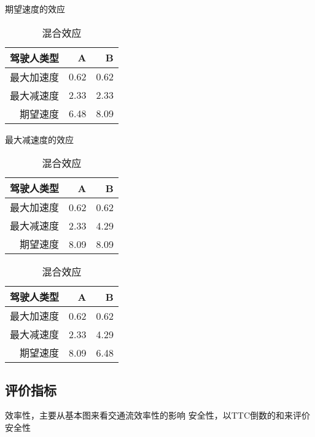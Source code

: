\begin{table}[htb] 
  \begin{minipage}[b]{0.25\linewidth} 
  \centering
  \caption{期望速度的效应}
    \begin{tabular}{rrr}
    \addlinespace
    \toprule
    驾驶人类型    & A     & B \\
    \midrule
    最大加速度 & 0.62  & 0.62 \\
    最大减速度 & 2.33  & 2.33 \\
    期望速度  & 6.48  & 8.09 \\
    \bottomrule
    \end{tabular}%
  \label{speed-factor}%
  \end{minipage}%
\hspace{0.08\linewidth}
  \begin{minipage}[b]{0.25\linewidth} 
  \centering
  \caption{最大减速度的效应}
    \begin{tabular}{rrr}
    \addlinespace
    \toprule
    驾驶人类型    & A     & B \\
    \midrule
    最大加速度 & 0.62  & 0.62 \\
    最大减速度 & 2.33  & 4.29 \\
    期望速度  & 8.09  & 8.09 \\
    \bottomrule
    \end{tabular}%
  \label{decel-factor}%
  \end{minipage}
\hspace{0.08\linewidth}
  \begin{minipage}[b]{0.25\linewidth} 
  \centering
  \caption{混合效应}
    \begin{tabular}{rrr}
    \addlinespace
    \toprule
    驾驶人类型    & A     & B \\
    \midrule
    最大加速度 & 0.62  & 0.62 \\
    最大减速度 & 2.33  & 4.29 \\
    期望速度  & 8.09  & 6.48 \\
    \bottomrule
    \end{tabular}%
  \label{combined-factor}%
  \end{minipage} 
\end{table}






\subsection{评价指标}
效率性，主要从基本图来看交通流效率性的影响
安全性，以TTC倒数的和来评价安全性


